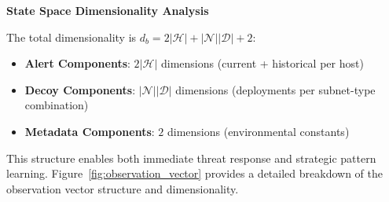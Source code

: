 \documentclass[12pt,oneside]{article}
\begin{document}
\textbf{State Space Dimensionality Analysis}

The total dimensionality is $d_b = 2|\mathcal{H}| + |\mathcal{N}||\mathcal{D}| + 2$:

\begin{itemize}
\item \textbf{Alert Components}: $2|\mathcal{H}|$ dimensions (current + historical per host)
\item \textbf{Decoy Components}: $|\mathcal{N}||\mathcal{D}|$ dimensions (deployments per subnet-type combination)  
\item \textbf{Metadata Components}: $2$ dimensions (environmental constants)
\end{itemize}

This structure enables both immediate threat response and strategic pattern learning. Figure~\ref{fig:observation_vector} provides a detailed breakdown of the observation vector structure and dimensionality.
\end{document}
